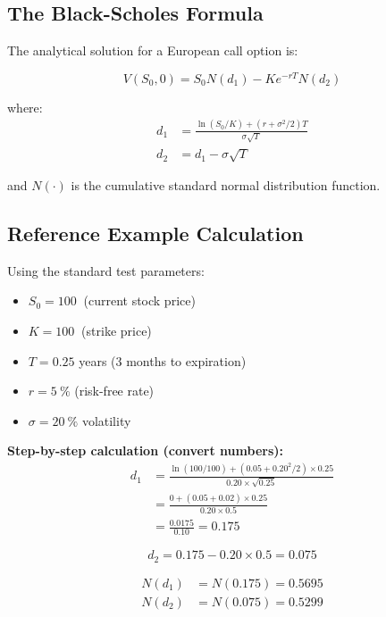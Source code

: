 \documentclass[12pt,a4paper]{article}
\numberwithin{algorithm}{subsection}
\begin{document}
\subsection{The Black-Scholes Formula}

The analytical solution for a European call option is:

\begin{equation}
V(S_0, 0) = S_0 N(d_1) - Ke^{-rT} N(d_2)
\end{equation}

where:
\begin{align}
d_1 &= \frac{\ln(S_0/K) + (r + \sigma^2/2)T}{\sigma\sqrt{T}} \\
d_2 &= d_1 - \sigma\sqrt{T}
\end{align}

and $N(\cdot)$ is the cumulative standard normal distribution function.

\subsection{Reference Example Calculation}

Using the standard test parameters:
\begin{itemize}
\item $S_0 = \SI{100}{}$ (current stock price)
\item $K = \SI{100}{}$ (strike price)
\item $T = \num{0.25}$ years (3 months to expiration)
\item $r = \SI{5}{\percent}$ (risk-free rate)
\item $\sigma = \SI{20}{\percent}$ volatility
\end{itemize}

\textbf{Step-by-step calculation (convert numbers):}
\begin{align}
d_1 &= \frac{\ln(\num{100}/\num{100}) + (\num{0.05} + \num{0.20}^2/2) \times \num{0.25}}{\num{0.20} \times \sqrt{\num{0.25}}} \\
    &= \frac{0 + (\num{0.05} + \num{0.02}) \times \num{0.25}}{\num{0.20} \times \num{0.5}} \\
    &= \frac{\num{0.0175}}{\num{0.10}} = \num{0.175}
\end{align}

\begin{equation}
d_2 = \num{0.175} - \num{0.20} \times \num{0.5} = \num{0.075}
\end{equation}

\begin{align}
N(d_1) &= N(\num{0.175}) = \num{0.5695} \\
N(d_2) &= N(\num{0.075}) = \num{0.5299}
\end{align}
\end{document}
